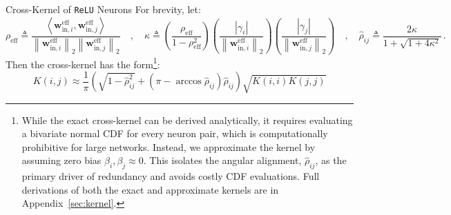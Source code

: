 \documentclass[11pt, a4paper, copyright, gdm]{google}
\newcommand{\norm}[1]{\left\lVert#1\right\rVert}
\newcommand{\inner}[2]{\left\langle#1, #2\right\rangle}
\newcommand{\wVect}{\boldsymbol{w}}
\newcommand{\ReLU}{\texttt{ReLU}\xspace}
\theoremstyle{definition}
\begin{document}
\begin{alertbox}{Cross-Kernel of \ReLU Neurons}
For brevity, let:
\begin{equation}
\label{eq:rho_hat_maintext}
\rho_{\text{eff}} \triangleq \frac{\inner{\wVect_{\text{in},i}^{\text{eff}}}{\wVect_{\text{in},j}^{\text{eff}}}}{\norm{\wVect_{\text{in},i}^{\text{eff}}}_2 \norm{\wVect_{\text{in},j}^{\text{eff}}}_2} \quad,\quad \kappa \triangleq \left( \frac{\rho_{\text{eff}}}{1 - \rho_{\text{eff}}^2} \right) \left( \frac{|\gamma_i|}{\norm{\wVect_{\text{in},i}^{\text{eff}}}_2} \right) \left( \frac{|\gamma_j|}{\norm{\wVect_{\text{in},j}^{\text{eff}}}_2} \right) \quad,\quad
\hat{\rho}_{ij} \triangleq \frac{2\kappa}{1 + \sqrt{1 + 4\kappa^2}} \,.
\end{equation}
Then the cross-kernel has the form\footnote{While the exact cross-kernel can be derived analytically, it requires evaluating a bivariate normal CDF for every neuron pair, which is computationally prohibitive for large networks. Instead, we approximate the kernel by assuming zero bias $\beta_i, \beta_j \approx 0$. This isolates the angular alignment, $\hat{\rho}_{ij}$, as the primary driver of redundancy and avoids costly CDF evaluations. Full derivations of both the exact and approximate kernels are in Appendix~\ref{sec:kernel}.}:
\begin{equation}
    K(i, j) \approx \frac{1}{\pi} \left( \sqrt{1 - \hat{\rho}_{ij}^2} + (\pi - \arccos \hat{\rho}_{ij}) \hat{\rho}_{ij} \right) \sqrt{K(i, i) K(j, j)}
\end{equation}
\end{alertbox}
\end{document}
